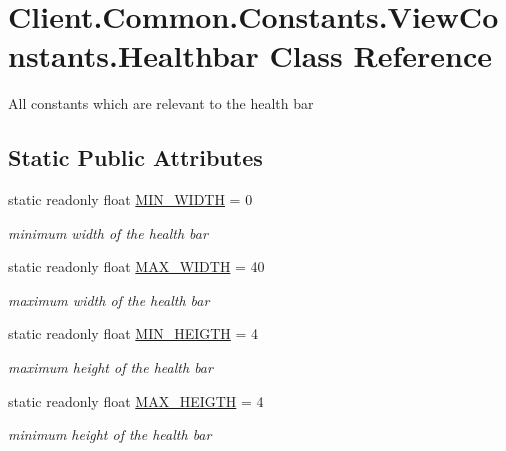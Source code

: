 \hypertarget{classClient_1_1Common_1_1Constants_1_1ViewConstants_1_1Healthbar}{}\section{Client.\+Common.\+Constants.\+View\+Constants.\+Healthbar Class Reference}
\label{classClient_1_1Common_1_1Constants_1_1ViewConstants_1_1Healthbar}


All constants which are relevant to the health bar  


\subsection*{Static Public Attributes}
\begin{DoxyCompactItemize}
\item 
static readonly float \hyperlink{classClient_1_1Common_1_1Constants_1_1ViewConstants_1_1Healthbar_a3178669ef5c1c802c28b99ece9344a9e}{M\+I\+N\+\_\+\+W\+I\+D\+T\+H} = 0
\begin{DoxyCompactList}\small\item\em minimum width of the health bar \end{DoxyCompactList}\item 
static readonly float \hyperlink{classClient_1_1Common_1_1Constants_1_1ViewConstants_1_1Healthbar_ac0d0ec72a75ca7f0270fe01065888b90}{M\+A\+X\+\_\+\+W\+I\+D\+T\+H} = 40
\begin{DoxyCompactList}\small\item\em maximum width of the health bar \end{DoxyCompactList}\item 
static readonly float \hyperlink{classClient_1_1Common_1_1Constants_1_1ViewConstants_1_1Healthbar_adfac4a7fd0503eea0051df10af402a0a}{M\+I\+N\+\_\+\+H\+E\+I\+G\+T\+H} = 4
\begin{DoxyCompactList}\small\item\em maximum height of the health bar \end{DoxyCompactList}\item 
static readonly float \hyperlink{classClient_1_1Common_1_1Constants_1_1ViewConstants_1_1Healthbar_a44eeb8c9930130408877a84f0e7686d9}{M\+A\+X\+\_\+\+H\+E\+I\+G\+T\+H} = 4
\begin{DoxyCompactList}\small\item\em minimum height of the health bar \end{DoxyCompactList}\item 

\end{DoxyCompactItemize}
